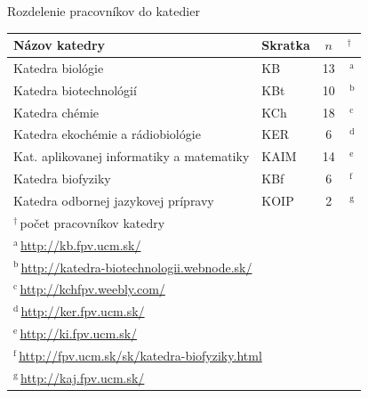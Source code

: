 \documentclass{beamer}
\begin{document}
%
%
\begin{frame}{Rozdelenie pracovníkov do katedier}
  \begin{table}
    \footnotesize
    \begin{tabular}{llc@{}l}
      \toprule
      Názov katedry & Skratka & $n$&$^\dagger$ \\
      \midrule
      Katedra biológie                          & KB   &           13&\,$^{\mathrm{a}}$ \\
      Katedra biotechnológií                    & KBt  &           10&\,$^{\mathrm{b}}$ \\
      Katedra chémie                            & KCh  &           18&\,$^{\mathrm{c}}$ \\
      Katedra ekochémie a rádiobiológie         & KER  & \phantom{1}6&\,$^{\mathrm{d}}$ \\
      Kat. aplikovanej informatiky a matematiky & KAIM &           14&\,$^{\mathrm{e}}$ \\
      Katedra biofyziky                         & KBf  & \phantom{1}6&\,$^{\mathrm{f}}$ \\
      Katedra odbornej jazykovej prípravy       & KOIP & \phantom{1}2&\,$^{\mathrm{g}}$ \\
      \bottomrule
      \multicolumn{4}{l}{\tiny $^\dagger$\,počet pracovníkov katedry} \\
      \multicolumn{4}{l}{\tiny $^{\mathrm{a}}$\,\url{http://kb.fpv.ucm.sk/}} \\
      \multicolumn{4}{l}{\tiny $^{\mathrm{b}}$\,\url{http://katedra-biotechnologii.webnode.sk/}} \\
      \multicolumn{4}{l}{\tiny $^{\mathrm{c}}$\,\url{http://kchfpv.weebly.com/}} \\
      \multicolumn{4}{l}{\tiny $^{\mathrm{d}}$\,\url{http://ker.fpv.ucm.sk/}} \\
      \multicolumn{4}{l}{\tiny $^{\mathrm{e}}$\,\url{http://ki.fpv.ucm.sk/}} \\
      \multicolumn{4}{l}{\tiny $^{\mathrm{f}}$\,\url{http://fpv.ucm.sk/sk/katedra-biofyziky.html}} \\
      \multicolumn{4}{l}{\tiny $^{\mathrm{g}}$\,\url{http://kaj.fpv.ucm.sk/}} \\
    \end{tabular}
  \end{table}
\end{frame}

%
%
\end{document}
